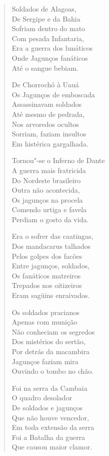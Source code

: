 \begin{verse}
Soldados de Alagoas, \\
De Sergipe e da Bahia \\
Sofriam dentro do mato \\
Com pesada Infantaria, \\
Era a guerra dos lunáticos \\
Onde Jagunços fanáticos \\
Até o sangue bebiam. 
\pagebreak

De Chorrochó à Uauá \\
Os Jagunços de emboscada \\
Assassinavam soldados \\
Até mesmo de pedrada, \\
Nos arvoredos ocultos \\
Sorriam, faziam insultos \\
Em histérica gargalhada. 

Tornou"-se o Inferno de Dante \\
A guerra mais fratricida \\
Do Nordeste brasileiro \\
Outra não acontecida, \\
Os jagunços na procela \\
Comendo urtiga e favela \\
Perdiam o gosto da vida. 

Era o sofrer das caatingas, \\
Dos mandacarus talhados \\
Pelos golpes dos facões \\
Entre jagunços, soldados, \\
Os fanáticos matreiros \\
Trepados nos oitizeiros \\
Eram sagüins enraivados. 

Os soldados pracianos \\
Apenas com munição \\
Não conheciam os segredos \\
Dos mistérios do sertão, \\
Por detrás da macambira \\
Jagunços faziam mira \\
Ouvindo o tombo no chão. 
\pagebreak

Foi na serra da Cambaia \\
O quadro desolador \\
De soldados e jagunços \\
Que não houve vencedor, \\
Em toda extensão da serra \\
Foi a Batalha da guerra \\
Que causou maior clamor. 


\end{verse}

